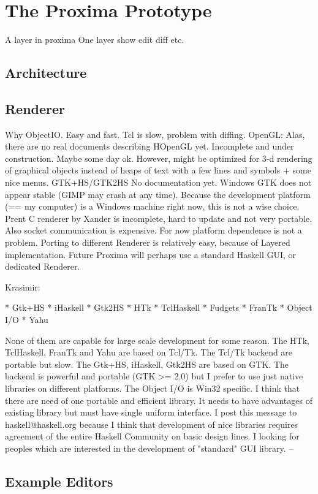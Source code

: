 \chapter{The Proxima Prototype}

A layer in proxima
One layer
show edit diff etc. 
\section{Architecture}







\section{Renderer}
Why ObjectIO. 
Easy and fast.
Tcl is slow, problem with diffing. 
OpenGL: Alas, there are no real documents describing HOpenGL yet. Incomplete and under construction. Maybe some day ok. However, might be optimized for 3-d rendering of graphical objects instead of heaps of text with a few lines and symbols + some nice menus.
GTK+HS/GTK2HS No documentation yet. Windows GTK does not appear stable (GIMP may crash at any time). Because the development platform (== my computer) is a Windows machine right now, this is not a wise choice.
Prent C renderer by Xander is incomplete, hard to update and not very portable. Also socket communication is expensive.
For now platform dependence is not a problem.
Porting to different Renderer is relatively easy, because of Layered implementation.
Future Proxima will perhaps use a standard Haskell GUI, or dedicated Renderer.


Krasimir:

  * Gtk+HS
   * iHaskell
   * Gtk2HS
   * HTk
   * TclHaskell
   * Fudgets
   * FranTk
   * Object I/O
   * Yahu

None of them are capable for large scale development 
for some reason. The HTk, TclHaskell, FranTk and Yahu 
are based on Tcl/Tk. The Tcl/Tk backend are portable 
but slow. The Gtk+HS, iHaskell, Gtk2HS are based on
GTK. The backend is powerful and portable (GTK >= 2.0)
but I prefer to use just native libraries on 
different platforms. The Object I/O is Win32 specific.
I think that there are need of one portable and 
efficient library. It needs to have advantages of
existing library but must have single uniform
interface. I post this message to haskell@haskell.org 
because I think that development of nice libraries 
requires agreement of the entire Haskell Community on
basic design lines. I looking for peoples which are
interested in the development of "standard" GUI
library.
--

\section{Example Editors}
